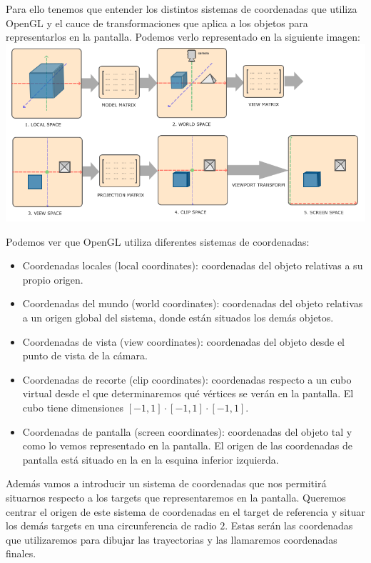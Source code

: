 \documentclass[a4paper,11pt, oneside]{book}
\begin{document}
Para ello tenemos que entender los distintos sistemas de coordenadas que utiliza OpenGL y el cauce de transformaciones que aplica a los objetos para representarlos en la pantalla. Podemos verlo representado en la siguiente imagen:
\\

\includegraphics[scale=0.4]{coordinate_systems}



Podemos ver que OpenGL utiliza diferentes sistemas de coordenadas:
\begin{itemize}
	\item Coordenadas locales (local coordinates): coordenadas del objeto relativas a su propio origen.
	\item Coordenadas del mundo (world coordinates): coordenadas del objeto relativas a un origen global del sistema, donde están situados los demás objetos.
	\item Coordenadas de vista (view coordinates): coordenadas del objeto desde el punto de vista de la cámara.
	\item Coordenadas de recorte (clip coordinates): coordenadas respecto a un cubo virtual desde el que determinaremos qué vértices se verán en la pantalla. El cubo tiene dimensiones $[-1,1]\cdot[-1,1]\cdot[-1,1]$.
	\item Coordenadas de pantalla (screen coordinates): coordenadas del objeto tal y como lo vemos representado en la pantalla. El origen de las coordenadas de pantalla está situado en la en la esquina inferior izquierda.
\end{itemize} 

Además vamos a introducir un sistema de coordenadas que nos permitirá situarnos respecto a los targets que representaremos en la pantalla. Queremos centrar el origen de este sistema de coordenadas en el target de referencia y situar los demás targets en una circunferencia de radio $2$. Estas serán las coordenadas que utilizaremos para dibujar las trayectorias y las llamaremos coordenadas finales.
\end{document}
